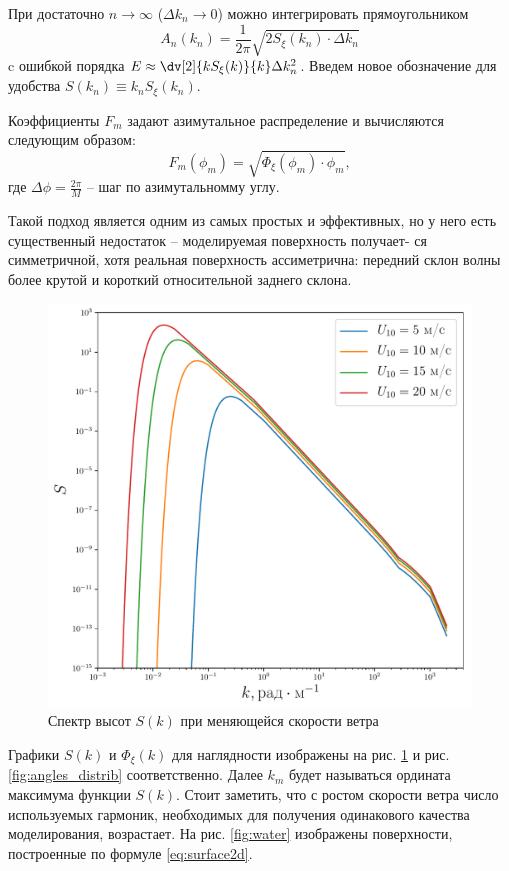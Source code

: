 \documentclass[a4paper,14pt]{extarticle}
\begin{document}
При достаточно $n \to \infty$ ($\Delta k_n \to 0$) можно интегрировать
прямоугольником
\begin{equation}
    \label{eq:}
    A_n(k_n) = \frac{1}{2 \pi} \sqrt{ 2 S_\xi(k_n) \cdot \Delta k_n}
\end{equation}
c ошибкой порядка $E \approx \dv[2]{k S_\xi(k)}{k} \Delta k_n^2$. Введем новое
обозначение для удобства $S(k_n)\equiv k_n S_\xi (k_n)$.

Коэффициенты $F_m$ задают азимутальное распределение и вычисляются следующим
образом:
\begin{equation}
    F_m (\phi_m) = \sqrt{\Phi_\xi(\phi_m) \cdot \phi_m},
\end{equation}
где $\Delta \phi = \frac{2\pi}{M}$ -- шаг по азимутальномму углу.

Такой подход является одним из самых простых и эффективных, но у
него есть существенный недостаток – моделируемая поверхность получает-
ся симметричной, хотя реальная поверхность ассиметрична: передний склон
волны более крутой и короткий относительной заднего склона.
\begin{figure}[h!]
        \centering
        \includegraphics[width=0.6\linewidth]{fig/full_spectrum1}
        \caption{Спектр высот $S(k)$ при меняющейся скорости ветра}
        \label{fig:spectrum_heights}
\end{figure}

Графики $S(k)$ и  $\Phi_\xi(k)$ для наглядности изображены на рис.
\ref{fig:spectrum_heights} и рис. \ref{fig:angles_distrib} соответственно.
Далее $k_m$ будет называться ордината максимума функции  $S(k)$. Стоит
заметить, что с ростом скорости ветра число используемых гармоник, необходимых
для получения одинакового качества моделирования,
возрастает. На рис. \ref{fig:water} изображены поверхности,
построенные по формуле \eqref{eq:surface2d}.
\end{document}
